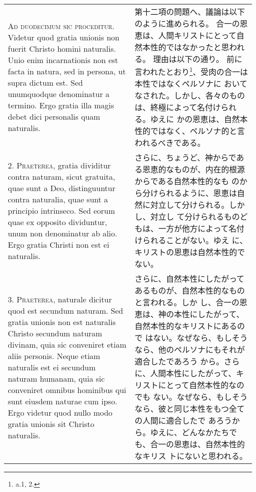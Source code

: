 \documentclass[10pt]{jsarticle} %
\begin{document}
\begin{longtable}{p{21em}p{21em}}



{\Huge A}{\scshape d duodecimum sic proceditur}. Videtur quod gratia unionis non fuerit
Christo homini naturalis. Unio enim incarnationis non est facta in
natura, sed in persona, ut supra dictum est. Sed unumquodque denominatur
a termino. Ergo gratia illa magis debet dici personalis quam naturalis.


&

第十二項の問題へ、議論は以下のように進められる。
合一の恩恵は、人間キリストにとって自然本性的ではなかったと思われる。
理由は以下の通り。
前に言われたとおり\footnote{a.1, 2.}、受肉の合一は本性ではなくペルソナに
 おいてなされた。しかし、各々のものは、終極によって名付けられる。ゆえに
 かの恩恵は、自然本性的ではなく、ペルソナ的と言われるべきである。


\\



2. {\scshape Praeterea}, gratia dividitur contra naturam, sicut gratuita, quae sunt a
Deo, distinguuntur contra naturalia, quae sunt a principio
intrinseco. Sed eorum quae ex opposito dividuntur, unum non denominatur
ab alio. Ergo gratia Christi non est ei naturalis.


&


さらに、ちょうど、神からである恩恵的なものが、内在的根源からである自然本性的なも
 のから分けられるように、恩恵は自然に対立して分けられる。しかし、対立し
 て分けられるものどもは、一方が他方によって名付けられることがない。ゆえ
 に、キリストの恩恵は自然本性的でない。

\\



3. {\scshape Praeterea}, naturale dicitur quod est secundum naturam. Sed gratia
unionis non est naturalis Christo secundum naturam divinam, quia sic
conveniret etiam aliis personis. Neque etiam naturalis est ei secundum
naturam humanam, quia sic conveniret omnibus hominibus qui sunt eiusdem
naturae cum ipso. Ergo videtur quod nullo modo gratia unionis sit
Christo naturalis.


&

さらに、自然本性にしたがってあるものが、自然本性的なものと言われる。しか
 し、合一の恩恵は、神の本性にしたがって、自然本性的なキリストにあるので
 はない。なぜなら、もしそうなら、他のペルソナにもそれが適合したであろう
 から。さらに、人間本性にしたがって、キリストにとって自然本性的なのでも
 ない。なぜなら、もしそうなら、彼と同じ本性をもつ全ての人間に適合したで
 あろうから。ゆえに、どんなかたちでも、合一の恩恵は、自然本性的なキリス
 トにないと思われる。



\end{longtable}
\end{document}
